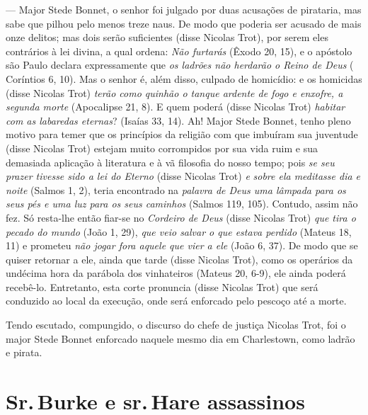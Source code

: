 --- Major Stede Bonnet, o senhor foi julgado por duas acusações de pirataria,
mas sabe que pilhou pelo menos treze naus. De modo que poderia ser acusado
de mais onze delitos; mas dois serão suficientes (disse Nicolas Trot), por
serem eles contrários à lei divina, a qual ordena: \textit{Não furtarás}
(Êxodo 20, 15), e o apóstolo são Paulo declara expressamente que
\textit{os ladrões não herdarão o Reino de Deus} ( Coríntios 6, 10). Mas
o senhor é, além disso, culpado de homicídio: e os homicidas (disse
Nicolas Trot) \textit{terão como quinhão o tanque ardente de fogo e
enxofre, a segunda morte} (Apocalipse 21, 8). E quem poderá (disse Nicolas
Trot) \textit{habitar com as labaredas eternas}? (Isaías 33, 14). Ah!
Major Stede Bonnet, tenho pleno motivo para temer que os princípios da
religião com que imbuíram sua juventude (disse Nicolas Trot) estejam muito
corrompidos por sua vida ruim e sua demasiada aplicação à literatura e à
vã filosofia do nosso tempo; pois \textit{se seu prazer tivesse sido a lei
do Eterno} (disse Nicolas Trot) \textit{e} \textit{sobre ela meditasse
dia e noite} (Salmos 1, 2), teria encontrado na\textit{ palavra de Deus
uma lâmpada para os seus pés e uma luz para os seus caminhos} (Salmos 119, 105). 
Contudo, assim não fez. Só resta-lhe então fiar-se no
\textit{Cordeiro de Deus} (disse Nicolas Trot) \textit{que tira o pecado
do mundo} (João 1, 29), \textit{que veio salvar o que estava perdido}
(Mateus 18, 11) e prometeu \textit{não jogar fora aquele que vier a ele}
(João 6, 37). De modo que se quiser retornar a ele, ainda que tarde (disse
Nicolas Trot), como os operários da undécima hora da parábola dos
vinhateiros (Mateus 20, 6-9), ele ainda poderá recebê-lo. Entretanto, esta
corte pronuncia (disse Nicolas Trot) que será conduzido ao local da
execução, onde será enforcado pelo pescoço até a morte.

Tendo escutado, compungido, o discurso do chefe de justiça Nicolas Trot,
foi o major Stede Bonnet enforcado naquele mesmo dia em Charlestown, como
ladrão e pirata.

\chapter[Sr.\,Burke e sr.\,Hare assassinos \bigskip]{Sr.\,Burke e sr.\,Hare assassinos}

